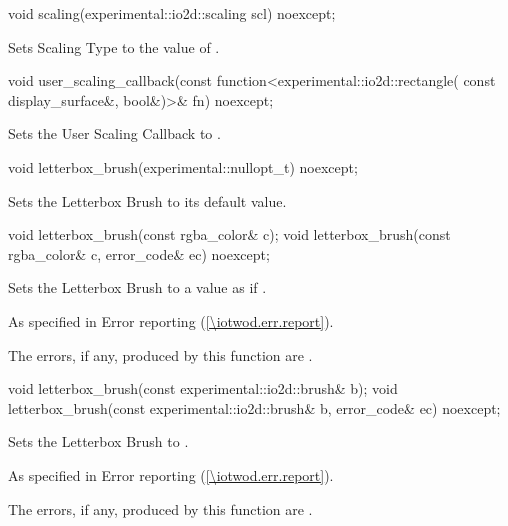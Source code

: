 \begin{itemdecl}
void scaling(experimental::io2d::scaling scl) noexcept;
\end{itemdecl}
\begin{itemdescr}
\pnum
\effects
Sets Scaling Type to the value of .
\end{itemdescr}

\begin{itemdecl}
void user_scaling_callback(const function<experimental::io2d::rectangle(
  const display_surface&, bool&)>& fn) noexcept;
\end{itemdecl}
\begin{itemdescr}
\pnum
\effects
Sets the User Scaling Callback to .
\end{itemdescr}

\begin{itemdecl}
void letterbox_brush(experimental::nullopt_t) noexcept;
\end{itemdecl}
\begin{itemdescr}
\pnum
\effects
Sets the Letterbox Brush to its default value.
\end{itemdescr}

\begin{itemdecl}
void letterbox_brush(const rgba_color& c);
void letterbox_brush(const rgba_color& c, error_code& ec) noexcept;
\end{itemdecl}
\begin{itemdescr}
\pnum
\effects
Sets the Letterbox Brush to a value as if .

\pnum
\throws
As specified in Error reporting (\ref{\iotwod.err.report}).

\pnum
\errors
The errors, if any, produced by this function are .
\end{itemdescr}

\begin{itemdecl}
void letterbox_brush(const experimental::io2d::brush& b);
void letterbox_brush(const experimental::io2d::brush& b, error_code& ec) 
  noexcept;
\end{itemdecl}
\begin{itemdescr}
\pnum
\effects
Sets the Letterbox Brush to .

\pnum
\throws
As specified in Error reporting (\ref{\iotwod.err.report}).

\pnum
\errors
The errors, if any, produced by this function are .
\end{itemdescr}

